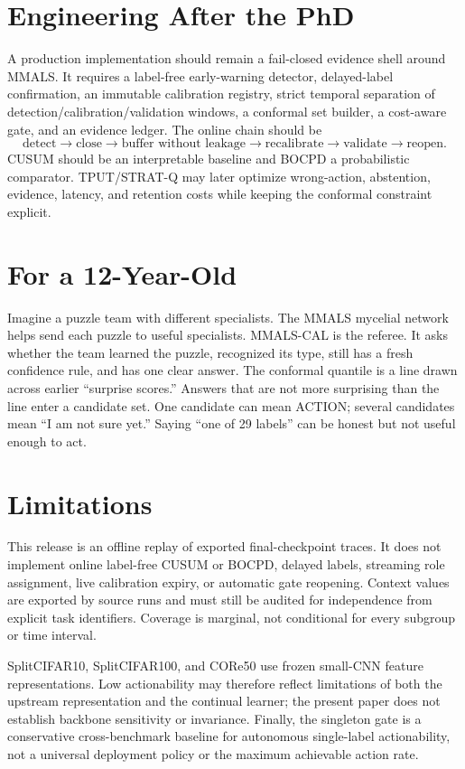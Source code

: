 \documentclass[10pt]{article}
\begin{document}
\section{Engineering After the PhD}
A production implementation should remain a fail-closed evidence shell around MMALS. It requires a label-free early-warning detector, delayed-label confirmation, an immutable calibration registry, strict temporal separation of detection/calibration/validation windows, a conformal set builder, a cost-aware gate, and an evidence ledger. The online chain should be
\begin{equation}
\text{detect}\rightarrow\text{close}\rightarrow\text{buffer without leakage}\rightarrow\text{recalibrate}\rightarrow\text{validate}\rightarrow\text{reopen}.
\end{equation}
CUSUM should be an interpretable baseline and BOCPD a probabilistic comparator. TPUT/STRAT-Q may later optimize wrong-action, abstention, evidence, latency, and retention costs while keeping the conformal constraint explicit.

\section{For a 12-Year-Old}
Imagine a puzzle team with different specialists. The MMALS mycelial network helps send each puzzle to useful specialists. MMALS-CAL is the referee. It asks whether the team learned the puzzle, recognized its type, still has a fresh confidence rule, and has one clear answer. The conformal quantile is a line drawn across earlier ``surprise scores.'' Answers that are not more surprising than the line enter a candidate set. One candidate can mean ACTION; several candidates mean ``I am not sure yet.'' Saying ``one of 29 labels'' can be honest but not useful enough to act.

\section{Limitations}
This release is an offline replay of exported final-checkpoint traces. It does not implement online label-free CUSUM or BOCPD, delayed labels, streaming role assignment, live calibration expiry, or automatic gate reopening. Context values are exported by source runs and must still be audited for independence from explicit task identifiers. Coverage is marginal, not conditional for every subgroup or time interval.

SplitCIFAR10, SplitCIFAR100, and CORe50 use frozen small-CNN feature representations. Low actionability may therefore reflect limitations of both the upstream representation and the continual learner; the present paper does not establish backbone sensitivity or invariance. Finally, the singleton gate is a conservative cross-benchmark baseline for autonomous single-label actionability, not a universal deployment policy or the maximum achievable action rate.
\end{document}
